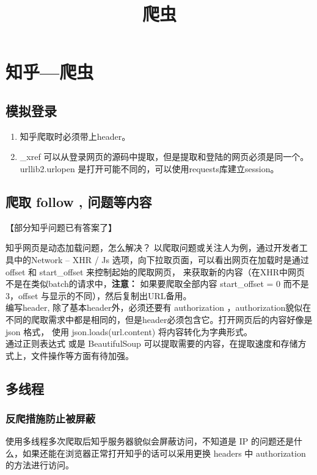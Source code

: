 \documentclass{article}
\title{爬虫}
\begin{document}
   \maketitle
   \section*{\Large 知乎---爬虫}
   \subsection{模拟登录} 
  \begin{enumerate}
    \item 知乎爬取时必须带上header。
    \item \_xref 可以从登录网页的源码中提取，但是提取和登陆的网页必须是同一个。urllib2.urlopen 是打开可能不同的，可以使用requests库建立session。
  \end{enumerate}

    \subsection{爬取 follow , 问题等内容}
    【部分知乎问题已有答案了】

    知乎网页是动态加载问题，怎么解决？
    以爬取问题或关注人为例，通过开发者工具中的Network -- XHR / Js 选项，向下拉取页面，可以看出网页在加载时是通过  offset 和  start\_offset 来控制起始的爬取网页，
     来获取新的内容（在XHR中网页不是在类似batch的请求中，\textbf{注意：} 如果要爬取全部内容  start\_offset = 0 而不是  3，offset  与显示的不同），然后复制出URL备用。
\\

    编写header, 除了基本header外，必须还要有 authorization ，authorization貌似在不同的爬取需求中都是相同的，但是header必须包含它。打开网页后的内容好像是 json 格式， 使用 json.loads(url.content) 将内容转化为字典形式。
\\

    通过正则表达式 或是 BeautifulSoup 可以提取需要的内容，在提取速度和存储方式上，文件操作等方面有待加强。
      
      \subsection{多线程 }
      \subsubsection{反爬措施防止被屏蔽}
      使用多线程多次爬取后知乎服务器貌似会屏蔽访问，不知道是  IP 的问题还是什么，如果还能在浏览器正常打开知乎的话可以采用更换 headers 中 authorization 的方法进行访问。
\end{document}
